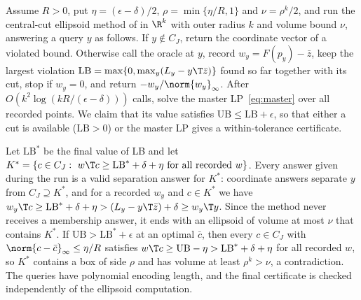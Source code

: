 Assume $R>0$, put $\eta=(\epsilon-\delta)/2$, $\rho=\min\{\eta/R,1\}$ and
$\nu=\rho^k/2$, and run the central-cut ellipsoid method of
\citet[Theorem~3.2.1]{GrotschelLovaszSchrijver1988} in $\R^k$ with outer
radius $k$ and volume bound $\nu$, answering a query $y$ as follows. If
$y\notin C_J$, return the coordinate vector of a violated bound. Otherwise
call the oracle at $y$, record $w_y=F(p_y)-\bar z$, keep the largest
violation $\mathrm{LB}=\max\{0,\max_y(L_y-y\T\bar z)\}$ found so far together
with its cut, stop if $w_y=0$, and return $-w_y/\norm{w_y}_\infty$. After
$O(k^2\log(kR/(\epsilon-\delta)))$ calls, solve the master LP~\eqref{eq:master}
over all recorded points. We claim that its value satisfies
$\mathrm{UB}\le\mathrm{LB}+\epsilon$, so that either a cut is available
($\mathrm{LB}>0$) or the master LP gives a within-tolerance certificate.

Let $\mathrm{LB}^\ast$ be the final value of LB and let
$K^\ast=\{c\in C_J:\ w\T c\ge\mathrm{LB}^\ast+\delta+\eta\ \text{for all recorded }w\}$.
Every answer given during the run is a valid separation answer for $K^\ast$:
coordinate answers separate $y$ from $C_J\supseteq K^\ast$, and for a
recorded $w_y$ and $c\in K^\ast$ we have
$w_y\T c\ge\mathrm{LB}^\ast+\delta+\eta>(L_y-y\T\bar z)+\delta\ge w_y\T y$.
Since the method never receives a membership answer, it ends with an
ellipsoid of volume at most $\nu$ that contains $K^\ast$. If
$\mathrm{UB}>\mathrm{LB}^\ast+\epsilon$ at an optimal $\bar c$, then every
$c\in C_J$ with $\norm{c-\bar c}_\infty\le\eta/R$ satisfies
$w\T c\ge\mathrm{UB}-\eta>\mathrm{LB}^\ast+\delta+\eta$ for all recorded $w$, so
$K^\ast$ contains a box of side $\rho$ and has volume at least $\rho^k>\nu$,
a contradiction. The queries have polynomial encoding length, and the
final certificate is checked independently of the ellipsoid computation.

